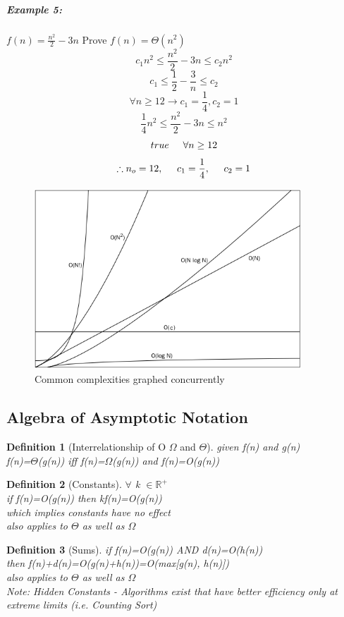 \documentclass[12pt,letterpaper]{article}
\newtheorem{definition}{Definition}[section]
\begin{document}
\subparagraph{Example 5:}
$f(n) = \frac{n^2}{2}-3n$ Prove $f(n)= \Theta(n^2)$
\[c_1n^2 \leq \frac{n^2}{2}-3n \leq c_2n^2\]
\[c_1 \leq \frac{1}{2}-\frac{3}{n} \leq c_2 \]
\[\forall n \geq 12 \to c_1=\frac{1}{4}, c_2=1\]
\[\frac{1}{4}n^2 \leq \frac{n^2}{2}-3n \leq n^2\]
\[true \hspace{.5cm} \forall n \geq 12\]
\[\therefore n_o=12,\hspace{.5cm} c_1=\frac{1}{4},\hspace{.5cm} c_2=1 \]

\begin{figure}[h]
\centering
\includegraphics[width=10cm]{bigofun}
\caption{Common complexities graphed concurrently}
\end{figure}
\subsection{Algebra of Asymptotic Notation}
\begin{definition}[Interrelationship of O $\Omega$ and $\Theta$]\hfill \break
given f(n) and g(n)\\ f(n)=$\Theta$(g(n)) iff f(n)=$\Omega$(g(n)) and f(n)=O(g(n)) 
\end{definition}
\begin{definition}[Constants]\hfill \break
$\forall$ k $\in \mathbb{R^+}$ \\
if f(n)=O(g(n)) then kf(n)=O(g(n))\\
which implies constants have no effect \\
also applies to $\Theta$ as well as $\Omega$
\end{definition}

\begin{definition}[Sums]\hfill \break
if f(n)=O(g(n)) AND d(n)=O(h(n))\\
then f(n)+d(n)=O(g(n)+h(n))=O(max[g(n), h(n)])\\
also applies to $\Theta$ as well as $\Omega$\\
Note: Hidden Constants - Algorithms exist that have better efficiency only at extreme limits (i.e. Counting Sort)
\end{definition}
\end{document}
